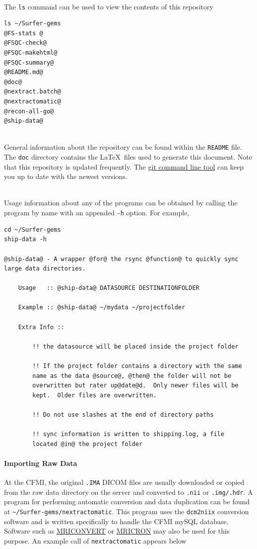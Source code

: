 \documentclass[paper=a4, fontsize=11pt]{scrartcl} %
\numberwithin{equation}{section} %
\numberwithin{figure}{section} %
\numberwithin{table}{section} %
\begin{document}
~\\The \texttt{ls} command can be used to view the contents of this repository

\begin{lstlisting}
ls ~/Surfer-gems
@FS-stats @
@FSQC-check@
@FSQC-makehtml@
@FSQC-summary@
@README.md@
@doc@
@nextract.batch@
@nextractomatic@
@recon-all-go@
@ship-data@
\end{lstlisting}

~\\General information about the repository can be found within the \texttt{README} file.  The \texttt{doc} directory contains the \LaTeX\  files used to generate this document.  Note that this repository is updated frequently.  The \href{http://rogerdudler.github.io/git-guide/}{git command line tool} can keep you up to date with the newest versions.

~\\Usage information about any of the programs can be obtained by calling the program by name with an appended \texttt{-h} option.  For example,

\begin{lstlisting}
cd ~/Surfer-gems
ship-data -h

@ship-data@ - A wrapper @for@ the rsync @function@ to quickly sync large data directories.

	Usage   :: @ship-data@ DATASOURCE DESTINATIONFOLDER

	Example :: @ship-data@ ~/mydata ~/projectfolder

	Extra Info ::

		!! the datasource will be placed inside the project folder

		!! If the project folder contains a directory with the same
	   	name as the data @source@, @then@ the folder will not be
	   	overwritten but rater up@date@d.  Only newer files will be
	   	kept.  Older files are overwritten.

		!! Do not use slashes at the end of directory paths

		!! sync information is written to shipping.log, a file
		located @in@ the project folder
\end{lstlisting}

\paragraph{Importing Raw Data} At the CFMI, the original \texttt{.IMA} DICOM files are usually downloaded or copied from the raw data directory on the server and converted to \texttt{.nii} or \texttt{.img/.hdr}.  A program for performing automatic conversion and data duplication can be found at \mbox{\texttt{\textasciitilde/Surfer-gems/nextractomatic}}.   This program uses the \texttt{dcm2niix} conversion software and is written specifically to handle the CFMI mySQL database. Software such as \href{http://neuro.debian.net/pkgs/mriconvert.html}{MRICONVERT} or \href{http://www.mccauslandcenter.sc.edu/mricro/mricron/}{MRICRON} may also be used for this purpose.  An example call of \texttt{nextractomatic} appears below
\end{document}
